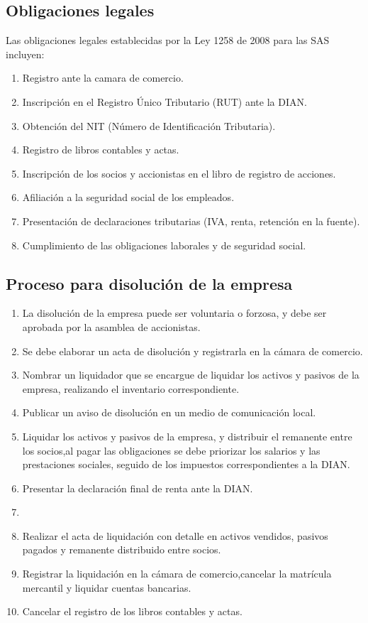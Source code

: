 \subsection*{Obligaciones legales}
Las obligaciones legales establecidas por la Ley 1258 de 2008 para las SAS incluyen:
\begin{enumerate}
    \item Registro ante la camara de comercio.
    \item Inscripción en el Registro Único Tributario (RUT) ante la DIAN.
    \item Obtención del NIT (Número de Identificación Tributaria).
    \item Registro de libros contables y actas.
    \item Inscripción de los socios y accionistas en el libro de registro de acciones.
    \item Afiliación a la seguridad social de los empleados.
    \item Presentación de declaraciones tributarias (IVA, renta, retención en la fuente).
    \item Cumplimiento de las obligaciones laborales y de seguridad social.
\end{enumerate}

\subsection*{Proceso para disolución de la empresa}
\begin{enumerate}

    \item La disolución de la empresa puede ser voluntaria o forzosa, y debe ser aprobada por la asamblea de accionistas.
    \item Se debe elaborar un acta de disolución y registrarla en la cámara de comercio.
    \item Nombrar un liquidador que se encargue de liquidar los activos y pasivos de la empresa, realizando el inventario correspondiente.
    \item Publicar un aviso de disolución en un medio de comunicación local.
    \item Liquidar los activos y pasivos de la empresa, y distribuir el remanente entre los socios,al pagar las obligaciones se debe priorizar los salarios y las prestaciones sociales, seguido de los impuestos correspondientes a la DIAN.
    \item Presentar la declaración final de renta ante la DIAN.
    \item \item Realizar el acta de liquidación con detalle en activos vendidos, pasivos pagados y remanente distribuido entre socios.
    \item Registrar la liquidación en la cámara de comercio,cancelar la matrícula mercantil y liquidar cuentas bancarias.
    \item Cancelar el registro de los libros contables y actas.
\end{enumerate}

